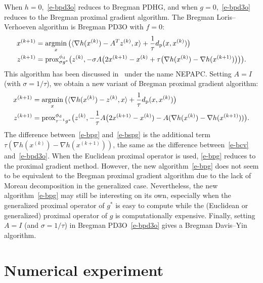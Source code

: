 \documentclass[letterpaper,11pt]{article}
\newcommand{\argmin}{\mathop{\rm argmin}}
\newcommand{\prox}{\mathrm{prox}}
\newcommand{\inprod}[2]{\langle#1, #2\rangle}
\newcommand{\primal}{\mathrm p}
\newcommand{\dual}{\mathrm d}
\begin{document}
When $h=0$,~\eqref{e-bpd3o} reduces to Bregman PDHG,
and when $g=0$,~\eqref{e-bpd3o} reduces to the Bregman proximal
gradient algorithm.
The Bregman Loris--Verhoeven algorithm is Bregman PD3O with $f=0$:
\begin{subequations} \label{e-blv}
\begin{align}
  x^{(k+1)} &= \argmin_x {\big(
    \inprod{\nabla h(x^{(k)})-A^Tz^{(k)}}{x}+\frac{1}{\tau}
    d_\primal (x,x^{(k)}) \big)} \\
  z^{(k+1)} &= \prox^{\phi_\dual}_{\sigma g^\ast} \big(z^{(k)},
    -\sigma A\big(2x^{(k+1)}-x^{(k)} + \tau
    \big(\nabla h(x^{(k)})-\nabla h(x^{(k+1)})\big)\big) \big).
\end{align}
\end{subequations}
This algorithm has been discussed in~\cite{CST21} under the name NEPAPC.
Setting $A=I$ (with $\sigma=1/\tau$),
we obtain a new variant of Bregman proximal gradient algorithm:
\begin{subequations} \label{e-bpg}
\begin{align}
  x^{(k+1)} &= \argmin_x {\big(
    \inprod{\nabla h(x^{(k)})-z^{(k)}}{x}+\frac{1}{\tau}
    d_\primal (x,x^{(k)}) \big)} \\
  z^{(k+1)} &= \prox^{\phi_\dual}_{\tau^{-1} g^\ast} \big(z^{(k)},
    -\frac{1}{\tau}A\big(2x^{(k+1)}-x^{(k)})
    -A(\nabla h(x^{(k)})-\nabla h(x^{(k+1)})) \big).
\end{align}
\end{subequations}
The difference between~\eqref{e-bpg} and~\eqref{e-bspg} is
the additional term $\tau(\nabla h(x^{(k)})-\nabla h(x^{(k+1)}))$,
the same as the difference between~\eqref{e-bcv} and~\eqref{e-bpd3o}.
When the Euclidean proximal operator is used,
\eqref{e-bpg} reduces to the proximal gradient method.
However, the new algorithm~\eqref{e-bpg} does not seem
to be equivalent to the Bregman proximal gradient algorithm
due to the lack of Moreau decomposition in the generalized case.
Nevertheless, the new algorithm~\eqref{e-bpg}
may still be interesting on its own,
especially when the generalized proximal operator of $g^\ast$ is easy to
compute while the (Euclidean or generalized) proximal operator of $g$
is computationally expensive.
Finally, setting $A=I$ (and $\sigma=1/\tau$)
in Bregman PD3O~\eqref{e-bpd3o} gives a Bregman Davis--Yin algorithm.


\section{Numerical experiment} \label{s-exp}
\end{document}

